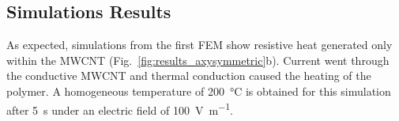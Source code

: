 \begin{table}[h]
	\center
	\caption{Material properties, unless noted, the properties for PEI are taken from SABIC's technical documentation}
	\label{tab:material_properties}
\end{table}

\FloatBarrier
\subsection{Simulations Results}

As expected, simulations from the first FEM show resistive heat generated only within the MWCNT (Fig.~\ref{fig:results_axysymmetric}b). 
Current went through the conductive MWCNT and thermal conduction caused the heating of the polymer. 
A homogeneous temperature of \SI{200}{\celsius} is obtained for this simulation after \SI{5}{\second} under an electric field of \SI{100}{\volt\per\metre}. 

